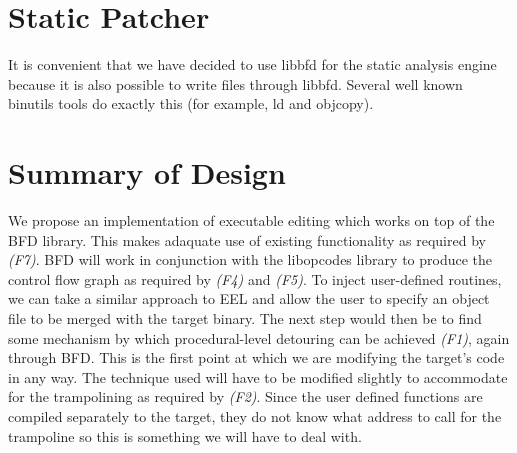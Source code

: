 \section{Static Patcher}

It is convenient that we have decided to use libbfd for the static analysis engine because it is also possible to write files through libbfd. Several well known binutils tools do exactly this (for example, ld and objcopy).

\section{Summary of Design}

We propose an implementation of executable editing which works on top of the BFD library. This makes adaquate use of existing functionality as required by \emph{(F7)}. BFD will work in conjunction with the libopcodes library to produce the control flow graph as required by \emph{(F4)} and \emph{(F5)}. To inject user-defined routines, we can take a similar approach to EEL and allow the user to specify an object file to be merged with the target binary. The next step would then be to find some mechanism by which procedural-level detouring can be achieved \emph{(F1)}, again through BFD. This is the first point at which we are modifying the target's code in any way. The technique used will have to be modified slightly to accommodate for the trampolining as required by \emph{(F2)}. Since the user defined functions are compiled separately to the target, they do not know what address to call for the trampoline so this is something we will have to deal with.